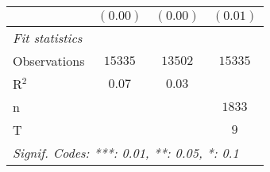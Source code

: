\begin{tabular}{lccc}
                       & $(0.00)$                          & $(0.00)$         & $(0.01)$     \\
   \midrule
   \emph{Fit statistics}                                                                     \\
   Observations        & $15335$                           & $13502$          & $15335$      \\
   R$^2$               & $0.07$                            & $0.03$           &              \\
   n                   &                                   &                  & $1833$       \\
   T                   &                                   &                  & $9$          \\
   \midrule \midrule
   \multicolumn{4}{l}{\emph{Signif. Codes: ***: 0.01, **: 0.05, *: 0.1}}                     \\
\end{tabular}
\par\endgroup

